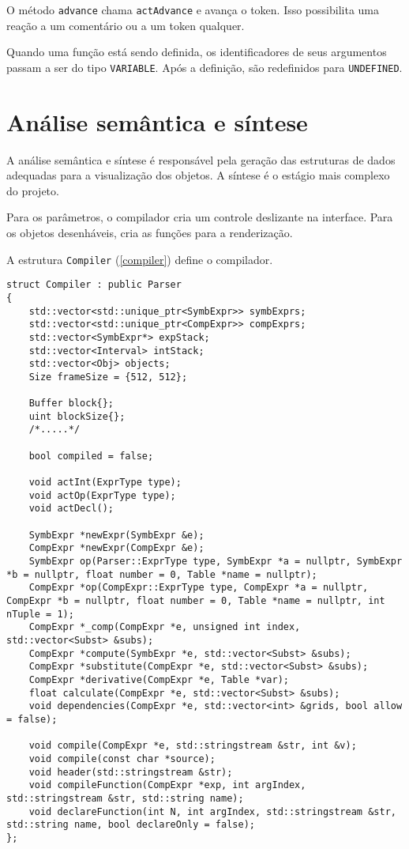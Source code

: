 O método \texttt{advance} chama \texttt{actAdvance} e avança o token.
Isso possibilita uma reação a um comentário ou a um token qualquer.

Quando uma função está sendo definida, os identificadores de seus argumentos
passam a ser do tipo \texttt{VARIABLE}.
Após a definição, são redefinidos para \texttt{UNDEFINED}.

\section{Análise semântica e síntese}
A análise semântica e síntese é responsável pela geração das estruturas de dados
adequadas para a visualização dos objetos.
A síntese é o estágio mais complexo do projeto.

Para os parâmetros, o compilador cria um controle deslizante na interface.
Para os objetos desenháveis, cria as funções para a renderização.

\newpage
A estrutura \texttt{Compiler} (\ref{compiler}) define o compilador.

\begin{lstlisting}[caption=Estrutura parcial do compilador, label=compiler]
struct Compiler : public Parser
{
    std::vector<std::unique_ptr<SymbExpr>> symbExprs;
    std::vector<std::unique_ptr<CompExpr>> compExprs;
    std::vector<SymbExpr*> expStack;
    std::vector<Interval> intStack;
    std::vector<Obj> objects;
    Size frameSize = {512, 512};

    Buffer block{};
    uint blockSize{};
    /*.....*/

    bool compiled = false;

    void actInt(ExprType type);
    void actOp(ExprType type);
    void actDecl();
    
    SymbExpr *newExpr(SymbExpr &e);
    CompExpr *newExpr(CompExpr &e);
    SymbExpr op(Parser::ExprType type, SymbExpr *a = nullptr, SymbExpr *b = nullptr, float number = 0, Table *name = nullptr);
    CompExpr *op(CompExpr::ExprType type, CompExpr *a = nullptr, CompExpr *b = nullptr, float number = 0, Table *name = nullptr, int nTuple = 1);
    CompExpr *_comp(CompExpr *e, unsigned int index, std::vector<Subst> &subs);
    CompExpr *compute(SymbExpr *e, std::vector<Subst> &subs);
    CompExpr *substitute(CompExpr *e, std::vector<Subst> &subs);
    CompExpr *derivative(CompExpr *e, Table *var);
    float calculate(CompExpr *e, std::vector<Subst> &subs);
    void dependencies(CompExpr *e, std::vector<int> &grids, bool allow = false);

    void compile(CompExpr *e, std::stringstream &str, int &v);
    void compile(const char *source);
    void header(std::stringstream &str);
    void compileFunction(CompExpr *exp, int argIndex, std::stringstream &str, std::string name);
    void declareFunction(int N, int argIndex, std::stringstream &str, std::string name, bool declareOnly = false);
};
\end{lstlisting}

